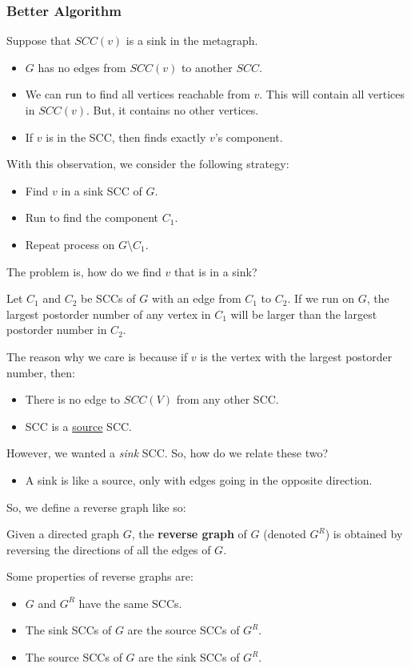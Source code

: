 \documentclass[letterpaper]{article}
\begin{document}
\subsubsection{Better Algorithm}
Suppose that $SCC(v)$ is a sink in the metagraph.
\begin{itemize}
    \item $G$ has no edges from $SCC(v)$ to another $SCC$. 
    \item We can run  to find all vertices reachable from $v$. This will contain all vertices in $SCC(v)$. But, it contains no other vertices. 
    \item If $v$ is in the SCC, then  finds exactly $v$'s component. 
\end{itemize}
With this observation, we consider the following strategy:
\begin{itemize}
    \item Find $v$ in a sink SCC of $G$. 
    \item Run  to find the component $C_1$.
    \item Repeat process on $G \setminus C_1$.
\end{itemize}
The problem is, how do we find $v$ that is in a sink?
\begin{proposition}
    Let $C_1$ and $C_2$ be SCCs of $G$ with an edge from $C_1$ to $C_2$. If we run  on $G$, the largest postorder number of any vertex in $C_1$ will be larger than the largest postorder number in $C_2$. 
\end{proposition}
The reason why we care is because if $v$ is the vertex with the largest postorder number, then: 
\begin{itemize}
    \item There is no edge to $SCC(V)$ from any other SCC. 
    \item SCC is a \underline{source} SCC.
\end{itemize}
However, we wanted a \emph{sink} SCC. So, how do we relate these two?
\begin{itemize}
    \item A sink is like a source, only with edges going in the opposite direction.
\end{itemize}
So, we define a reverse graph like so: 
\begin{definition}{}{}
    Given a directed graph $G$, the \textbf{reverse graph} of $G$ (denoted $G^R$) is obtained by reversing the directions of all the edges of $G$.
\end{definition}
Some properties of reverse graphs are: 
\begin{itemize}
    \item $G$ and $G^R$ have the same SCCs. 
    \item The sink SCCs of $G$ are the source SCCs of $G^R$. 
    \item The source SCCs of $G$ are the sink SCCs of $G^R$. 
\end{itemize}
\end{document}
